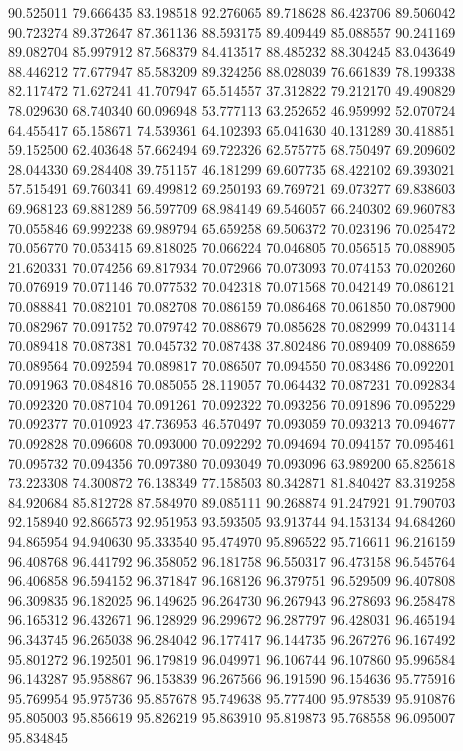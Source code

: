90.525011
79.666435
83.198518
92.276065
89.718628
86.423706
89.506042
90.723274
89.372647
87.361136
88.593175
89.409449
85.088557
90.241169
89.082704
85.997912
87.568379
84.413517
88.485232
88.304245
83.043649
88.446212
77.677947
85.583209
89.324256
88.028039
76.661839
78.199338
82.117472
71.627241
41.707947
65.514557
37.312822
79.212170
49.490829
78.029630
68.740340
60.096948
53.777113
63.252652
46.959992
52.070724
64.455417
65.158671
74.539361
64.102393
65.041630
40.131289
30.418851
59.152500
62.403648
57.662494
69.722326
62.575775
68.750497
69.209602
28.044330
69.284408
39.751157
46.181299
69.607735
68.422102
69.393021
57.515491
69.760341
69.499812
69.250193
69.769721
69.073277
69.838603
69.968123
69.881289
56.597709
68.984149
69.546057
66.240302
69.960783
70.055846
69.992238
69.989794
65.659258
69.506372
70.023196
70.025472
70.056770
70.053415
69.818025
70.066224
70.046805
70.056515
70.088905
21.620331
70.074256
69.817934
70.072966
70.073093
70.074153
70.020260
70.076919
70.071146
70.077532
70.042318
70.071568
70.042149
70.086121
70.088841
70.082101
70.082708
70.086159
70.086468
70.061850
70.087900
70.082967
70.091752
70.079742
70.088679
70.085628
70.082999
70.043114
70.089418
70.087381
70.045732
70.087438
37.802486
70.089409
70.088659
70.089564
70.092594
70.089817
70.086507
70.094550
70.083486
70.092201
70.091963
70.084816
70.085055
28.119057
70.064432
70.087231
70.092834
70.092320
70.087104
70.091261
70.092322
70.093256
70.091896
70.095229
70.092377
70.010923
47.736953
46.570497
70.093059
70.093213
70.094677
70.092828
70.096608
70.093000
70.092292
70.094694
70.094157
70.095461
70.095732
70.094356
70.097380
70.093049
70.093096
63.989200
65.825618
73.223308
74.300872
76.138349
77.158503
80.342871
81.840427
83.319258
84.920684
85.812728
87.584970
89.085111
90.268874
91.247921
91.790703
92.158940
92.866573
92.951953
93.593505
93.913744
94.153134
94.684260
94.865954
94.940630
95.333540
95.474970
95.896522
95.716611
96.216159
96.408768
96.441792
96.358052
96.181758
96.550317
96.473158
96.545764
96.406858
96.594152
96.371847
96.168126
96.379751
96.529509
96.407808
96.309835
96.182025
96.149625
96.264730
96.267943
96.278693
96.258478
96.165312
96.432671
96.128929
96.299672
96.287797
96.428031
96.465194
96.343745
96.265038
96.284042
96.177417
96.144735
96.267276
96.167492
95.801272
96.192501
96.179819
96.049971
96.106744
96.107860
95.996584
96.143287
95.958867
96.153839
96.267566
96.191590
96.154636
95.775916
95.769954
95.975736
95.857678
95.749638
95.777400
95.978539
95.910876
95.805003
95.856619
95.826219
95.863910
95.819873
95.768558
96.095007
95.834845
